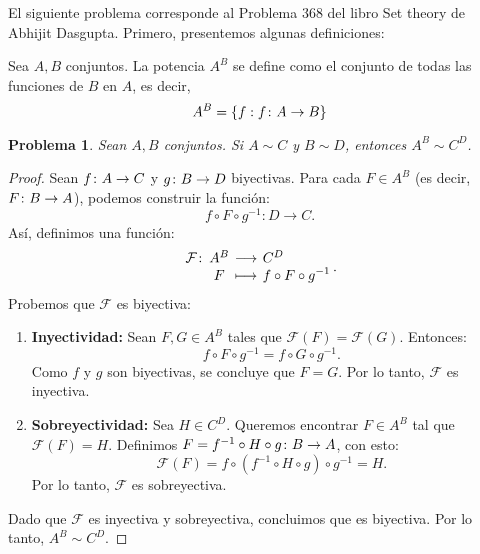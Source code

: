 \documentclass[a4,10pt]{aleph-notas}
\newtheorem*{prob}{Problema}
\begin{document}
\encabezado

\noindent
El siguiente problema corresponde al Problema 368 del libro Set theory de Abhijit Dasgupta. Primero, presentemos algunas definiciones:

\begin{defi}
    Sea \(A, B\) conjuntos. La potencia \(A^B\) se define como el conjunto de todas las funciones de \(B\) en \(A\), es decir, 
    \[
        A^B = \{f : f\colon A \rightarrow B\}
    \]
\end{defi}

\begin{prob}
    Sean $A, B$ conjuntos. Si \(A \sim C\) y \(B \sim D\), entonces \(A^B \sim C^D\).
\end{prob}

\begin{proof}
    Sean \(f\colon A \rightarrow C\) y \(g\colon B \rightarrow D\) biyectivas.  
    Para cada \(F \in A^B\) (es decir, \(F\colon B \rightarrow A\)), podemos construir la función:
    \[
        f \circ F \circ g^{-1}: D \to C.
    \]
    Así, definimos una función:
    \[
        \funcion{\mathcal{F}}{A^B}{C^D}{F}{f \circ F \circ g^{-1}}.
    \]
    Probemos que \(\mathcal{F}\) es biyectiva:
    \begin{enumerate}
        \item \textbf{Inyectividad:}  
        Sean \(F, G \in A^B\) tales que \(\mathcal{F}(F) = \mathcal{F}(G)\). Entonces:
        \[
        f \circ F \circ g^{-1} = f \circ G \circ g^{-1}.
        \]
        Como \(f\) y \(g\) son biyectivas, se concluye que \(F = G\). Por lo tanto, \(\mathcal{F}\) es inyectiva.
        
        \item \textbf{Sobreyectividad:}  
        Sea \(H \in C^D\). Queremos encontrar \(F \in A^B\) tal que \(\mathcal{F}(F) = H\).  
        Definimos \(F=f^{-1} \circ H \circ g\colon B \rightarrow A\), con esto:
        \[
            \mathcal{F}(F) = f \circ (f^{-1} \circ H \circ g) \circ g^{-1} = H.
        \]
        Por lo tanto, \(\mathcal{F}\) es sobreyectiva.
    \end{enumerate}
    
    Dado que \(\mathcal{F}\) es inyectiva y sobreyectiva, concluimos que es biyectiva. Por lo tanto, \(A^B \sim C^D\).

\end{proof}

    
\end{document}
